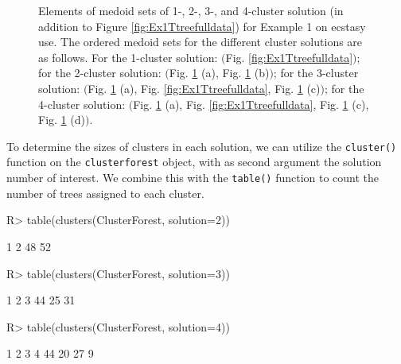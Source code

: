 \begin{figure}[H]
	\centering
	\begin{subfigure}[t]{.49\textwidth}
		\centering
		\captionsetup{justification=centering}
		
		\caption{}	
	\end{subfigure}%
	\begin{subfigure}[t]{.49\textwidth}
		\centering
		\captionsetup{justification=centering}
	
		\caption{}
	\end{subfigure}
	\newline
	
	\begin{subfigure}[t]{.49\textwidth}
		\centering
		\captionsetup{justification=centering}
		
		\caption{}
	\end{subfigure}
\begin{subfigure}[t]{.49\textwidth}
	\centering
	\captionsetup{justification=centering}
	
	\caption{}
\end{subfigure}

	\caption{Elements of medoid sets of 1-, 2-, 3-, and 4-cluster solution (in addition to Figure \ref{fig:Ex1Ttreefulldata}) for Example 1 on ecstasy use. The ordered medoid sets for the different cluster solutions are as follows. For the 1-cluster solution: $\bigl($Fig. \ref{fig:Ex1Ttreefulldata}$\bigl)$; for the 2-cluster solution: $\bigl($Fig. \ref{fig:Ex1Medoids} (a), Fig. \ref{fig:Ex1Medoids} (b)$\bigl)$; for the 3-cluster solution: $\bigl($Fig. \ref{fig:Ex1Medoids} (a), Fig. \ref{fig:Ex1Ttreefulldata}, Fig. \ref{fig:Ex1Medoids} (c)$\bigl)$; for the 4-cluster solution: $\bigl($Fig. \ref{fig:Ex1Medoids} (a), Fig. \ref{fig:Ex1Ttreefulldata}, Fig. \ref{fig:Ex1Medoids} (c), Fig. \ref{fig:Ex1Medoids} (d)$\bigl)$.}
	\label{fig:Ex1Medoids}
\end{figure}



To determine the sizes of clusters in each solution, we can utilize the \texttt{cluster()} function on the \texttt{clusterforest} object, 
with as second argument the solution number of interest. We combine this with the \texttt{table()} function to count the number of trees assigned to each cluster.
\begin{example}
R> table(clusters(ClusterForest, solution=2))

 1  2 
48 52 

R> table(clusters(ClusterForest, solution=3))

 1  2  3 
44 25 31 

R> table(clusters(ClusterForest, solution=4))

 1  2  3  4 
44 20 27  9 

\end{example}

